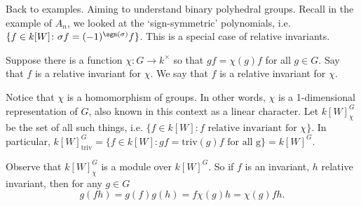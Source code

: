 Back to examples. Aiming to understand binary polyhedral groups. Recall in the example of $A_n$, we looked at the `sign-symmetric' polynomials, i.e. $\{ f \in k[W] \colon \sigma f= (-1)^{\sgn(\sigma)} f \}$. This is a special case of relative invariants. 

\begin{dfn}
Suppose there is a function $\chi: G \to k^\times$ so that $gf= \chi(g)f$ for all $g \in G$. Say that $f$ is a relative invariant for $\chi$. We say that $f$ is a relative invariant for $\chi$.
\end{dfn}

Notice that $\chi$ is a homomorphism of groups. In other words, $\chi$ is a 1-dimensional representation of $G$, also known in this context as a linear character. Let $k[W]^G_\chi$ be the set of all such things, i.e. $\{ f \in k[W] \colon f \text{ relative invariant for }\chi\}$. In particular, $k[W]^G_{\text{triv}}= \{ f \in k[W] \colon gf=\text{triv}(g)f \text{ for all g}\}=k[W]^G$. 

Observe that $k[W]^G_\chi$ is a module over $k[W]^G$. So if $f$ is an invariant, $h$ relative invariant, then for any $g \in G$
	\[
	g(fh)= g(f)g(h) = f \chi(g) h = \chi(g) fh.
	\]


